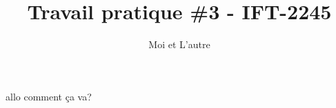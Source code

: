 \documentclass{article}
\title{Travail pratique \#3 - IFT-2245}
\author{Moi et L'autre}
\begin{document}
\maketitle

allo comment ça va?
\end{document}
